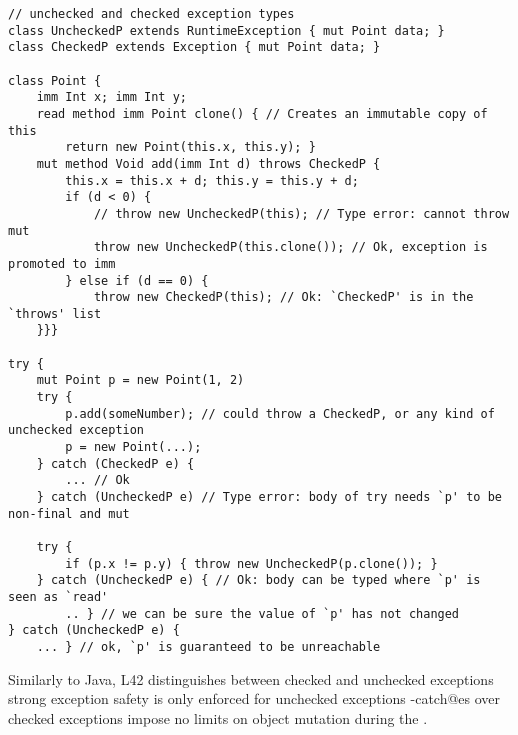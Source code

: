 \SS
\begin{lstlisting}
// unchecked and checked exception types
class UncheckedP extends RuntimeException { mut Point data; }
class CheckedP extends Exception { mut Point data; }

class Point {
	imm Int x; imm Int y;
	read method imm Point clone() { // Creates an immutable copy of this
		return new Point(this.x, this.y); }
	mut method Void add(imm Int d) throws CheckedP {
		this.x = this.x + d; this.y = this.y + d;
		if (d < 0) {
			// throw new UncheckedP(this); // Type error: cannot throw mut
			throw new UncheckedP(this.clone()); // Ok, exception is promoted to imm
		} else if (d == 0) {
			throw new CheckedP(this); // Ok: `CheckedP' is in the `throws' list
	}}}

try {
	mut Point p = new Point(1, 2)
	try {
		p.add(someNumber); // could throw a CheckedP, or any kind of unchecked exception
		p = new Point(...);
	} catch (CheckedP e) {
		... // Ok
	} catch (UncheckedP e) // Type error: body of try needs `p' to be non-final and mut

	try {
		if (p.x != p.y) { throw new UncheckedP(p.clone()); }
	} catch (UncheckedP e) { // Ok: body can be typed where `p' is seen as `read'
		.. } // we can be sure the value of `p' has not changed
} catch (UncheckedP e) {
	... } // ok, `p' is guaranteed to be unreachable
\end{lstlisting}

Similarly to Java, L42 distinguishes between checked and unchecked exceptions\IO[2.3]{,} strong exception safety is only enforced for unchecked exceptions
\Q@try-catch@es over checked exceptions impose no limits on object mutation during the \Q@try@.







